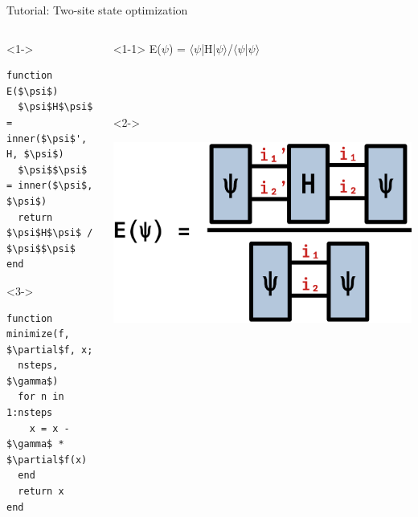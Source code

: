 \begin{frame}[fragile]{Tutorial: Two-site state optimization}

\begin{columns}

\begin{column}{5cm}

\begin{onlyenv}<1->
\begin{lstlisting}[language=JuliaLocal, style=julia, mathescape, basicstyle=\scriptsize\ttfamily]
function E($\psi$)
  $\psi$H$\psi$ = inner($\psi$', H, $\psi$)
  $\psi$$\psi$ = inner($\psi$, $\psi$)
  return $\psi$H$\psi$ / $\psi$$\psi$
end
\end{lstlisting}
\end{onlyenv}

\begin{onlyenv}<3->
\begin{lstlisting}[language=JuliaLocal, style=julia, mathescape, basicstyle=\scriptsize\ttfamily]
function minimize(f, $\partial$f, x;
  nsteps, $\gamma$)
  for n in 1:nsteps
    x = x - $\gamma$ * $\partial$f(x)
  end
  return x
end
\end{lstlisting}
\end{onlyenv}

\end{column}

\begin{column}{5cm}

\begin{onlyenv}<1-1>
E($\psi$) = $\langle$$\psi$|H|$\psi$$\rangle$/$\langle$$\psi$|$\psi$$\rangle$
~\\
~\\
~\\
~\\
\end{onlyenv}

\begin{onlyenv}<2->
\vspace*{0.0cm}
\begin{center}
\includegraphics[width=1.0\textwidth]{
  slides/assets/psi12Hpsi12.png
}
\end{center}
\vspace*{0.0cm}
\end{onlyenv}


\end{column}
\end{columns}
\end{frame}
